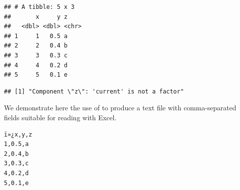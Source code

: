 \documentclass[krantz2]{krantz}\usepackage{knitr}%
\begin{document}
\begin{knitrout}\footnotesize
{}\color{fgcolor}\begin{kframe}
\begin{alltt}
 \hlkwb{<-} \hlstd{(} \hlstd{=} \hlstd{)}
\end{alltt}


{\ttfamily\noindent\itshape\color{messagecolor}{\#\# Parsed with column specification:\\\#\# cols(\\\#\#\ \  x = col\_double(),\\\#\#\ \  y = col\_double(),\\\#\#\ \  z = col\_character()\\\#\# )}}\begin{alltt}
\end{alltt}
\begin{verbatim}
## # A tibble: 5 x 3
##       x     y z    
##   <dbl> <dbl> <chr>
## 1     1   0.5 a    
## 2     2   0.4 b    
## 3     3   0.3 c    
## 4     4   0.2 d    
## 5     5   0.1 e
\end{verbatim}
\begin{alltt}
  \hlstd{=} \hlstd{)}
\end{alltt}
\begin{verbatim}
## [1] "Component \"z\": 'current' is not a factor"
\end{verbatim}
\end{kframe}
\end{knitrout}

We demonstrate here the use of  to produce a text file with comma-separated fields suitable for reading with Excel.
\begin{knitrout}\footnotesize
{}\color{fgcolor}\begin{kframe}
\begin{alltt}
  \hlstd{=} \hlstd{)}
\hlstd{(}\hlstd{,}  \hlstd{=} \hlstd{)}
\end{alltt}
\end{kframe}
\end{knitrout}

\begin{knitrout}\footnotesize
{}\color{fgcolor}\begin{kframe}
\begin{verbatim}
ï»¿x,y,z
1,0.5,a
2,0.4,b
3,0.3,c
4,0.2,d
5,0.1,e
\end{verbatim}
\end{kframe}
\end{knitrout}
\end{document}
